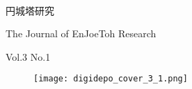 \documentclass[10pt, a5paper, twoside]{jsarticle}
\theoremstyle{definition}
\begin{document}
	\begin{center}

		~

		\fontsize{43pt}{20mm}\selectfont
		円城塔研究

		\vspace{3mm}

		\LARGE{The Journal of EnJoeToh Research}

		\vspace{3mm}

		\normalsize{Vol.3 No.1}

	\end{center}

	\vspace{10mm}

	\begin{figure}[h]

		\texttt{[image: digidepo\_cover\_3\_1.png]}

	\end{figure}{}

	\newpage

	\thispagestyle{empty}

	~

	\newpage
\end{document}
